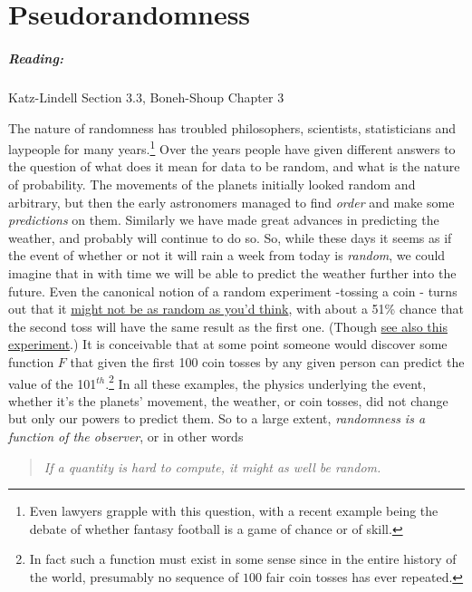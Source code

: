\chapter{Pseudorandomness}\label{Pseudorandomness}

\paragraph{Reading:} Katz-Lindell Section 3.3, Boneh-Shoup Chapter 3

The nature of randomness has troubled philosophers, scientists,
statisticians and laypeople for many years.\footnote{Even lawyers
  grapple with this question, with a recent example being the debate of
  whether fantasy football is a game of chance or of skill.} Over the
years people have given different answers to the question of what does
it mean for data to be random, and what is the nature of probability.
The movements of the planets initially looked random and arbitrary, but
then the early astronomers managed to find \emph{order} and make some
\emph{predictions} on them. Similarly we have made great advances in
predicting the weather, and probably will continue to do so. So, while
these days it seems as if the event of whether or not it will rain a
week from today is \emph{random}, we could imagine that in with time we
will be able to predict the weather further into the future. Even the
canonical notion of a random experiment -tossing a coin - turns out that
it \href{http://statweb.stanford.edu/~susan/papers/headswithJ.pdf}{might
not be as random as you'd think}, with about a 51\% chance that the
second toss will have the same result as the first one. (Though
\href{https://www.stat.berkeley.edu/~aldous/Real-World/coin_tosses.html}{see
also this experiment}.) It is conceivable that at some point someone
would discover some function \(F\) that given the first 100 coin tosses
by any given person can predict the value of the 101\(^{th}\).\footnote{In
  fact such a function must exist in some sense since in the entire
  history of the world, presumably no sequence of \(100\) fair coin
  tosses has ever repeated.} In all these examples, the physics
underlying the event, whether it's the planets' movement, the weather,
or coin tosses, did not change but only our powers to predict them. So
to a large extent, \emph{randomness is a function of the observer}, or
in other words

\begin{quote}
\emph{If a quantity is hard to compute, it might as well be random.}
\end{quote}

